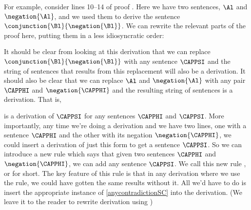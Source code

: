 For example, consider lines 10--14 of proof . Here we have two sentences, $\Al$ and $\negation{\Al}$, and we used them to derive the sentence $\conjunction{\Bl}{\negation{\Bl}}$. 
We can rewrite the relevant parts of the proof here, putting them in a less idiosyncratic order:
\begin{gproof}
\end{gproof}
It should be clear from looking at this derivation that we can replace $\conjunction{\Bl}{\negation{\Bl}}$ with any sentence $\CAPPSI$ and the string of sentences that results from this replacement will also be a derivation. 
It should also be clear that we can replace $\Al$ and $\negation{\Al}$ with any pair $\CAPPHI$ and $\negation{\CAPPHI}$ and the resulting string of sentences is a derivation. 
That is,
\begin{gproof}[\label{anycontradictionSC}]
\end{gproof}
is a derivation of $\CAPPSI$ for any sentences $\CAPPHI$ and $\CAPPSI$. 
More importantly, any time we're doing a derivation and we have two lines, one with a sentence $\CAPPHI$ and the other with its negation $\negation{\CAPPHI}$, we could insert a derivation of just this form to get a sentence $\CAPPSI$. 
So we can introduce a new rule which says that given two sentences $\CAPPHI$ and $\negation{\CAPPHI}$, we can add any sentence $\CAPPSI$. 
We call this new rule , or  for short. 
The key feature of this rule is that in any derivation where we use the rule, we could have gotten the same results without it. 
All we'd have to do is insert the appropriate instance of \ref{anycontradictionSC} into the derivation. (We leave it to the reader to rewrite derivation  using )

